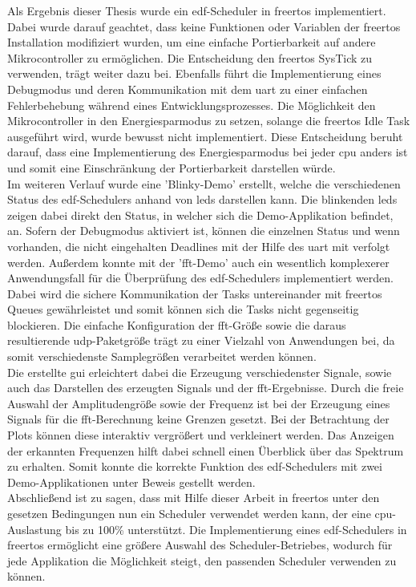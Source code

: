 \documentclass[../EDF Master Thesis.tex]{subfiles}
\begin{document}
    Als Ergebnis dieser Thesis wurde ein \ac{edf}-Scheduler in \ac{freertos} implementiert.
    Dabei wurde darauf geachtet, dass keine Funktionen oder Variablen der \ac{freertos} Installation modifiziert wurden, um eine einfache Portierbarkeit auf andere Mikrocontroller zu ermöglichen.
    Die Entscheidung den \ac{freertos} SysTick zu verwenden, trägt weiter dazu bei.
    Ebenfalls führt die Implementierung eines Debugmodus und deren Kommunikation mit dem \ac{uart} zu einer einfachen Fehlerbehebung während eines Entwicklungsprozesses.
    Die Möglichkeit den Mikrocontroller in den Energiesparmodus zu setzen, solange die \ac{freertos} Idle Task ausgeführt wird, wurde bewusst nicht implementiert.
    Diese Entscheidung beruht darauf, dass eine Implementierung des Energiesparmodus bei jeder \ac{cpu} anders ist und somit eine Einschränkung der Portierbarkeit darstellen würde.\\
    Im weiteren Verlauf wurde eine 'Blinky-Demo' erstellt, welche die verschiedenen Status des \ac{edf}-Schedulers anhand von \ac{led}s darstellen kann.
    Die blinkenden \ac{led}s zeigen dabei direkt den Status, in welcher sich die Demo-Applikation befindet, an.
    Sofern der Debugmodus aktiviert ist, können die einzelnen Status und wenn vorhanden, die nicht eingehalten Deadlines mit der Hilfe des \ac{uart} mit verfolgt werden.
    Außerdem konnte mit der '\ac{fft}-Demo' auch ein wesentlich komplexerer Anwendungsfall für die Überprüfung des \ac{edf}-Schedulers implementiert werden.
    Dabei wird die sichere Kommunikation der Tasks untereinander mit \ac{freertos} Queues gewährleistet und somit können sich die Tasks nicht gegenseitig blockieren.
    Die einfache Konfiguration der \ac{fft}-Größe sowie die daraus resultierende \ac{udp}-Paketgröße trägt zu einer Vielzahl von Anwendungen bei, da somit verschiedenste Samplegrößen verarbeitet werden können.\\
    Die erstellte \ac{gui} erleichtert dabei die Erzeugung verschiedenster Signale, sowie auch das Darstellen des erzeugten Signals und der \ac{fft}-Ergebnisse.
    Durch die freie Auswahl der Amplitudengröße sowie der Frequenz ist bei der Erzeugung eines Signals für die \ac{fft}-Berechnung keine Grenzen gesetzt.
    Bei der Betrachtung der Plots können diese interaktiv vergrößert und verkleinert werden.
    Das Anzeigen der erkannten Frequenzen hilft dabei schnell einen Überblick über das Spektrum zu erhalten.
    Somit konnte die korrekte Funktion des \ac{edf}-Schedulers mit zwei Demo-Applikationen unter Beweis gestellt werden.\\
    Abschließend ist zu sagen, dass mit Hilfe dieser Arbeit in \ac{freertos} unter den gesetzen Bedingungen nun ein Scheduler verwendet werden kann, der eine \ac{cpu}-Auslastung bis zu 100\% unterstützt.
    Die Implementierung eines \ac{edf}-Schedulers in \ac{freertos} ermöglicht eine größere Auswahl des Scheduler-Betriebes, wodurch für jede Applikation die Möglichkeit steigt, den passenden Scheduler verwenden zu können.
\end{document}
